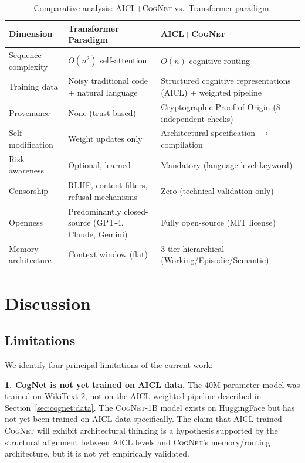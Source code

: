 \documentclass[11pt]{article}
\newcommand{\aicl}{\textsc{AICL}}
\newcommand{\cognet}{\textsc{CogNet}}
\newcommand{\proofoforigin}{Proof of Origin}
\begin{document}
\begin{table}[htbp]
\centering
\caption{Comparative analysis: \aicl{}+\cognet{} vs.\ Transformer paradigm.}
\label{tab:comparison}
\begin{tabular}{@{}lp{5.5cm}p{5.5cm}@{}}
\toprule
\textbf{Dimension} & \textbf{Transformer Paradigm} & \textbf{\aicl{}+\cognet{}} \\
\midrule
Sequence complexity & $O(n^{2})$ self-attention & $O(n)$ cognitive routing \\
\addlinespace
Training data & Noisy traditional code + natural language & Structured cognitive representations (\aicl{}) + weighted pipeline \\
\addlinespace
Provenance & None (trust-based) & Cryptographic \proofoforigin{} (8 independent checks) \\
\addlinespace
Self-modification & Weight updates only & Architectural specification $\to$ compilation \\
\addlinespace
Risk awareness & Optional, learned & Mandatory (language-level keyword) \\
\addlinespace
Censorship & RLHF, content filters, refusal mechanisms & Zero (technical validation only) \\
\addlinespace
Openness & Predominantly closed-source (GPT-4, Claude, Gemini) & Fully open-source (MIT license) \\
\addlinespace
Memory architecture & Context window (flat) & 3-tier hierarchical (Working/Episodic/Semantic) \\
\bottomrule
\end{tabular}
\end{table}

\section{Discussion}
\label{sec:discussion}

\subsection{Limitations}
\label{sec:discussion:limitations}

We identify four principal limitations of the current work:

\textbf{1. CogNet is not yet trained on AICL data.} The 40M-parameter model was trained on WikiText-2, not on the \aicl{}-weighted pipeline described in Section~\ref{sec:cognet:data}. The \cognet{}-1B model exists on HuggingFace but has not yet been trained on \aicl{} data specifically. The claim that \aicl{}-trained \cognet{} will exhibit architectural thinking is a hypothesis supported by the structural alignment between \aicl{} levels and \cognet{}'s memory/routing architecture, but it is not yet empirically validated.
\end{document}
